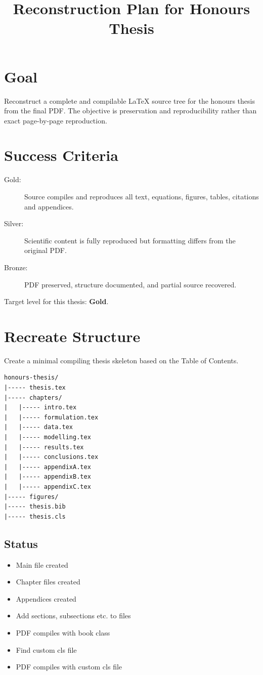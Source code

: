 \documentclass{article}
\title{Reconstruction Plan for Honours Thesis}
\newcommand{\done}{\textcolor{green!60!black}{\ding{51}}}
\begin{document}
\maketitle

\section*{Goal}

Reconstruct a complete and compilable \LaTeX{} source tree for the honours thesis from the
final PDF. The objective is preservation and reproducibility rather than exact page-by-page
reproduction.

\section*{Success Criteria}

\begin{description}
\item[Gold:] Source compiles and reproduces all text, equations, figures, tables,
citations and appendices.

\item[Silver:] Scientific content is fully reproduced but formatting differs from
the original PDF.

\item[Bronze:] PDF preserved, structure documented, and partial source recovered.
\end{description}

Target level for this thesis: \textbf{Gold}.

\section{\done Recreate Structure}

Create a minimal compiling thesis skeleton based on the Table of Contents.

\begin{verbatim}
honours-thesis/
|----- thesis.tex
|----- chapters/
|   |----- intro.tex
|   |----- formulation.tex
|   |----- data.tex
|   |----- modelling.tex
|   |----- results.tex
|   |----- conclusions.tex
|   |----- appendixA.tex
|   |----- appendixB.tex
|   |----- appendixC.tex
|----- figures/
|----- thesis.bib
|----- thesis.cls
\end{verbatim}

\subsection{Status}
\begin{itemize}
\item[\done] Main file created
\item[\done] Chapter files created
\item[\done] Appendices created
\item[\done] Add sections, subsections etc. to files
\item[\done] PDF compiles with book class
\item[\done] Find custom cls file
\item[\done] PDF compiles with custom cls file
\end{itemize}
\end{document}
